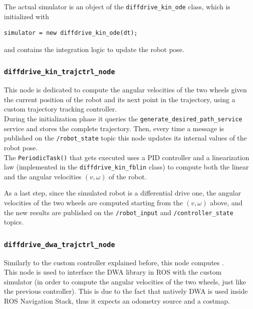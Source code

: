 \documentclass[11pt,a4paper]{article}
\begin{document}
The actual simulator is an object of the \texttt{diffdrive\_kin\_ode} class, which is initialized with
\begin{lstlisting}
simulator = new diffdrive_kin_ode(dt);
\end{lstlisting}

and contains the integration logic to update the robot pose.

\subsubsection{\texttt{diffdrive\_kin\_trajctrl\_node}}

This node is dedicated to compute the angular velocities of the two wheels given the current position
of the robot and its next point in the trajectory, using a custom trajectory tracking controller.\\

During the initialization phase it queries the \texttt{generate\_desired\_path\_service} service and
stores the complete trajectory.
Then, every time a message is published on the \texttt{/robot\_state} topic this node updates its
internal values of the robot pose.\\

The \texttt{PeriodicTask()} that gets executed uses a PID controller and a linearization law (implemented
in the \texttt{diffdrive\_kin\_fblin} class) to compute both the linear and the angular velocities
$(v, \omega)$ of the robot.

As a last step, since the simulated robot is a differential drive one, the angular velocities of
the two wheels are computed starting from the $(v, \omega)$ above, and the new results are published
on the \texttt{/robot\_input} and \texttt{/controller\_state} topics.

\subsubsection{\texttt{diffdrive\_dwa\_trajctrl\_node}}

Similarly to the custom controller explained before, this node computes .\\

This node is used to interface the DWA library in ROS with the custom simulator (in order to compute
the angular velocities of the two wheels, just like the previous controller).
This is due to the fact that natively DWA is used inside ROS Navigation Stack, thus it expects
an odometry source and a costmap.\\
\end{document}
